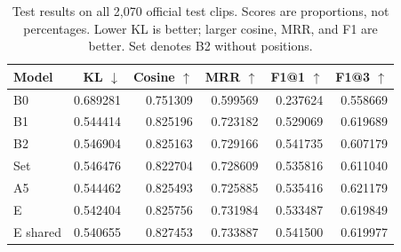 \begin{table}[!htbp]
\centering
\small
\setlength{\tabcolsep}{5pt}
\begin{tabular}{lrrrrr}
\toprule
Model & KL $\downarrow$ & Cosine $\uparrow$ & MRR $\uparrow$ & F1@1 $\uparrow$ & F1@3 $\uparrow$ \\
\midrule
B0 & 0.689281 & 0.751309 & 0.599569 & 0.237624 & 0.558669 \\
B1 & 0.544414 & 0.825196 & 0.723182 & 0.529069 & 0.619689 \\
B2 & 0.546904 & 0.825163 & 0.729166 & 0.541735 & 0.607179 \\
Set & 0.546476 & 0.822704 & 0.728609 & 0.535816 & 0.611040 \\
A5 & 0.544462 & 0.825493 & 0.725885 & 0.535416 & 0.621179 \\
E & 0.542404 & 0.825756 & 0.731984 & 0.533487 & 0.619849 \\
E shared & 0.540655 & 0.827453 & 0.733887 & 0.541500 & 0.619977 \\
\bottomrule
\end{tabular}
\caption{Test results on all 2,070 official test clips. Scores are proportions, not percentages. Lower KL is better; larger cosine, MRR, and F1 are better. Set denotes B2 without positions.}
\label{tab:primary}
\end{table}
